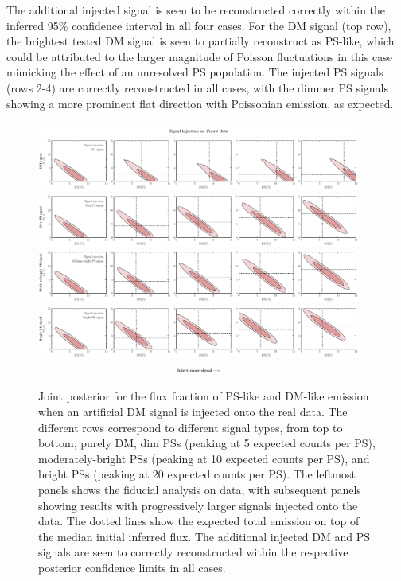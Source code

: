 \documentclass[prd,aps,10pt,nofootinbib,twocolumn,superscriptaddress,preprintnumbers,balancelastpage,longbibliography]{revtex4-1}
\begin{document}
The additional injected signal is seen to be reconstructed correctly within the inferred 95\% confidence interval in all four cases. For the DM signal (top row), the brightest tested DM signal is seen to partially reconstruct as PS-like, which could be attributed to the larger magnitude of Poisson fluctuations in this case mimicking the effect of an unresolved PS population. The injected PS signals (rows 2-4) are correctly reconstructed in all cases, with the dimmer PS signals showing a more prominent flat direction with Poissonian emission, as expected.

%
\begin{figure}
    \centering
    \includegraphics[width=0.95\textwidth]{plots/sig_inj_title.pdf}
    \includegraphics[width=0.95\textwidth]{plots/data_sig_inj_dm.pdf}
    \includegraphics[width=0.95\textwidth]{plots/data_sig_inj_dim_ps.pdf}
    \includegraphics[width=0.95\textwidth]{plots/data_sig_inj_med_ps.pdf}
    \includegraphics[width=0.95\textwidth]{plots/data_sig_inj_ps.pdf}
    \includegraphics[width=0.95\textwidth]{plots/sig_inj_chyron.pdf}
    \caption{Joint posterior for the flux fraction of PS-like and DM-like emission when an artificial DM signal is injected onto the real \Fermi data. The different rows correspond to different signal types, from top to bottom, purely DM, dim PSs (peaking at 5 expected counts per PS), moderately-bright PSs (peaking at 10 expected counts per PS), and bright PSs (peaking at 20 expected counts per PS). The leftmost panels shows the fiducial analysis on \Fermi data, with subsequent panels showing results with progressively larger signals injected onto the data. The dotted lines show the expected total emission on top of the median initial inferred flux. The additional injected DM and PS signals are seen to correctly reconstructed within the respective posterior confidence limits in all cases.}
    \label{fig:sig_inj_data}
\end{figure}
%
\end{document}
